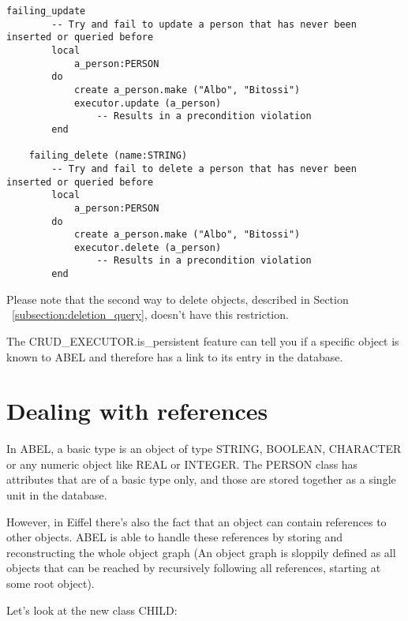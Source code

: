 \begin{lstlisting}[language=OOSC2Eiffel, captionpos=b, caption={}, label={lst:failing_update_delete}]
	failing_update
		-- Try and fail to update a person that has never been inserted or queried before
		local
			a_person:PERSON
		do
			create a_person.make ("Albo", "Bitossi")
			executor.update (a_person)
				-- Results in a precondition violation
		end

	failing_delete (name:STRING)
		-- Try and fail to delete a person that has never been inserted or queried before
		local
			a_person:PERSON
		do
			create a_person.make ("Albo", "Bitossi")
			executor.delete (a_person) 
				-- Results in a precondition violation
		end
\end{lstlisting}

Please note that the second way to delete objects, described in Section ~\ref{subsection:deletion_query}, doesn't have this restriction.

The CRUD\_EXECUTOR.is\_persistent feature can tell you if a specific object is known to ABEL and therefore has a link to its entry in the data\-base.






\section{Dealing with references}
\label {sec:references}

In ABEL, a basic type is an object of type STRING, BOOLEAN, CHARACTER or any numeric object like REAL or INTEGER.
The PERSON class has attributes that are of a basic type only, and those are stored together as a single unit in the database.

However, in Eiffel there's also the fact that an object can contain references to other objects.
ABEL is able to handle these references by storing and reconstructing the whole object graph 
(An object graph is sloppily defined as all objects that can be reached by recursively following all references, starting at some root object).

Let's look at the new class CHILD:

